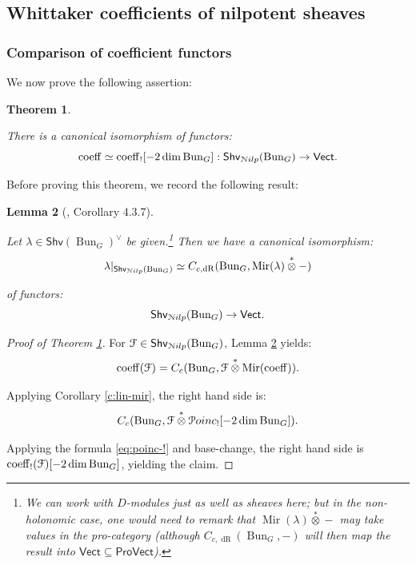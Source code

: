 \documentclass[reqno,11pt]{amsart}
\numberwithin{equation}{subsection}
\newtheorem{thm}{Theorem}[subsubsection]
\newtheorem{lem}[thm]{Lemma}
\theoremstyle{remark}
\newcommand{\sF}{{\EuScript F}}
\newcommand{\sN}{{\EuScript N}}
\newcommand{\sP}{{\EuScript P}}
\newcommand{\on}{\operatorname}
\newcommand{\Vect}{\mathsf{Vect}}
\newcommand{\Bun}{\on{Bun}}
\newcommand{\Pro}{\mathsf{Pro}}
\renewcommand{\subset}{\subseteq}
\newcommand{\coeff}{\on{coeff}}
\newcommand{\Poinc}{\sP oinc}
\newcommand{\Shv}{\mathsf{Shv}}
\newcommand{\Nilp}{\sN ilp}
\newcommand{\Mir}{\on{Mir}}
\newcommand{\dR}{\on{dR}}
\begin{document}
\subsection{Whittaker coefficients of nilpotent sheaves}

\subsubsection{Comparison of coefficient functors}

We now prove the following assertion:

\begin{thm}\label{t:coeff-!}

There is a canonical isomorphism of functors:
%
\[
\coeff \simeq \coeff_![-2\dim\Bun_G]:\Shv_{\Nilp}(\Bun_G) \to \Vect.
\]

\end{thm}

Before proving this theorem, we record the following result:

\begin{lem}[\cite{agkrrv2}, Corollary 4.3.7]\label{l:nilp-kernel}

Let $\lambda \in \Shv(\Bun_G)^{\vee}$ be given.\footnote{We can work
with $D$-modules just as well as sheaves here; but in the non-holonomic
case, one would need to remark that $\Mir(\lambda) \overset{*}{\otimes} -$
may take values in the pro-category (although $C_{c,\dR}(\Bun_G,-)$ will
then map the result into $\Vect \subset \Pro\Vect$).}
Then we have a canonical isomorphism:
%
\[
\lambda|_{\Shv_{\Nilp}(\Bun_G)} \simeq 
C_{c,\dR}(\Bun_G,\Mir(\lambda) \overset{*}{\otimes} -)
\]

\noindent of functors:
%
\[
\Shv_{\Nilp}(\Bun_G) \to \Vect.
\]

\end{lem}

\begin{proof}[Proof of Theorem \ref{t:coeff-!}]

For $\sF \in \Shv_{\Nilp}(\Bun_G)$, Lemma \ref{l:nilp-kernel} yields:
%
\[
\coeff(\sF) = C_c(\Bun_G, \sF \overset{*}{\otimes} \Mir(\coeff)).
\]

\noindent Applying Corollary \ref{c:lin-mir}, the right hand side is:
%
\[
C_c(\Bun_G, \sF \overset{*}{\otimes} \Poinc_![-2\dim \Bun_G]).
\]

\noindent Applying the formula \eqref{eq:poinc-!} and base-change,
the right hand side is $\coeff_!(\sF)[-2\dim\Bun_G]$, yielding the claim.

\end{proof}
\end{document}

